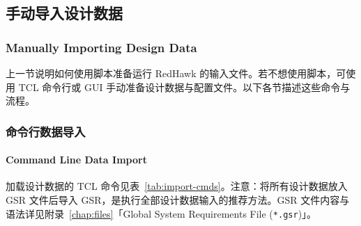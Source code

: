 \subsection{手动导入设计数据}
\subsubsection*{Manually Importing Design Data}

上一节说明如何使用脚本准备运行 RedHawk 的输入文件。若不想使用脚本，可使用 TCL 命令行或 GUI 手动准备设计数据与配置文件。以下各节描述这些命令与流程。

\subsubsection{命令行数据导入}
\paragraph*{Command Line Data Import}

加载设计数据的 TCL 命令见表~\ref{tab:import-cmds}。注意：将所有设计数据放入 GSR 文件后导入 GSR，是执行全部设计数据输入的推荐方法。GSR 文件内容与语法详见附录~\ref{chap:files}「Global System Requirements File (\texttt{*.gsr})」。

